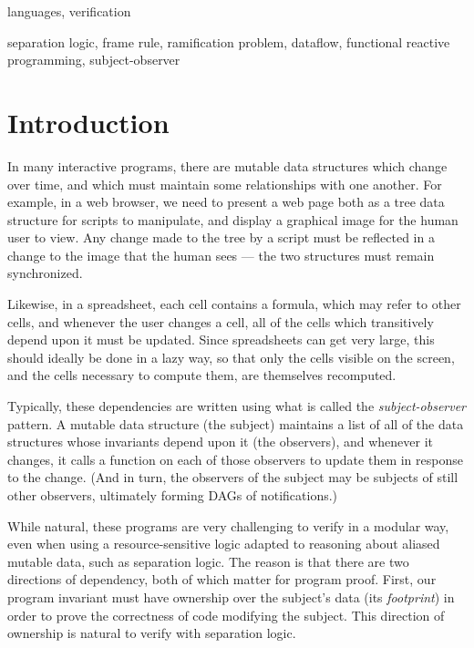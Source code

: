 \documentclass[preprint,natbib]{sigplanconf}
\begin{document}

\terms
languages, verification

\keywords
separation logic, frame rule, ramification problem, dataflow, 
functional reactive programming, subject-observer

\section{Introduction}

In many interactive programs, there are mutable data structures which
change over time, and which must maintain some relationships with one
another. For example, in a web browser, we need to present a web page
both as a tree data structure for scripts to manipulate, and 
display a graphical image for the human user to view. Any change made
to the tree by a script must be reflected in a change to the image
that the human sees --- the two structures must remain synchronized.

Likewise, in a spreadsheet, each cell contains a formula, which may
refer to other cells, and whenever the user changes a cell, all of the
cells which transitively depend upon it must be updated. Since
spreadsheets can get very large, this should ideally be done in a lazy
way, so that only the cells visible on the screen, and the cells
necessary to compute them, are themselves recomputed.

Typically, these dependencies are written using what is called the
\emph{subject-observer} pattern. A mutable data structure (the
subject) maintains a list of all of the data structures whose
invariants depend upon it (the observers), and whenever it changes, it
calls a function on each of those observers to update them in response
to the change. (And in turn, the observers of the subject may be
subjects of still other observers, ultimately forming DAGs of
notifications.)

While natural, these programs are very challenging to verify in a
modular way, even when using a resource-sensitive logic adapted to
reasoning about aliased mutable data, such as separation logic. The
reason is that there are two directions of dependency, both of which
matter for program proof. First, our program invariant must have
ownership over the subject's data (its \emph{footprint}) in order to
prove the correctness of code modifying the subject. This direction
of ownership is natural to verify with separation logic. 
\end{document}
